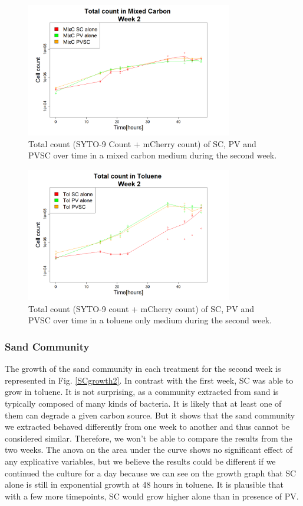 \documentclass[a4paper, 10pt, conference]{ieeeconf}   %
\begin{document}
\begin{figure}[H]
	\centering
	\includegraphics[width=9cm]{totcount_mixC2.PNG}
	\caption{Total count (SYTO-9 Count + mCherry count) of SC, PV and PVSC over time in a mixed carbon medium during the second week.}
	\label{totcountmixC2text}
\end{figure}

\begin{figure}[H]
	\centering
	\includegraphics[width=9cm]{totcount_tol2.PNG}
	\caption{Total count (SYTO-9 count + mCherry count) of SC, PV and PVSC over time in a toluene only medium during the second week.}
	\label{totcounttol2text}
\end{figure}
\subsubsection{Sand Community}
The growth of the sand community in each treatment for the second week is represented in Fig. \ref{SCgrowth2}.
In contrast with the first week, SC was able to grow in toluene. It is not surprising, as a community extracted from sand is typically composed of many kinds of bacteria. It is likely that at least one of them can degrade a given carbon source. But it shows that the sand community we extracted behaved differently from one week to another and thus cannot be considered similar. Therefore, we won't be able to compare the results from the two weeks. 
The anova on the area under the curve shows no significant effect of any explicative variables, but we believe the results could be different if we continued the culture for a day because we can see on the growth graph that SC alone is still in exponential growth at 48 hours in toluene. It is plausible that with a few more timepoints, SC would grow higher alone than in presence of PV.\newline
\end{document}
